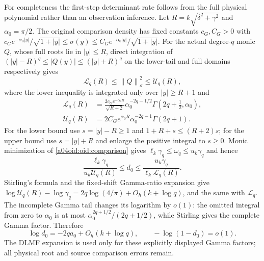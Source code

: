 \documentclass[11pt,a4paper]{article}
\providecommand{\norm}[1]{\left\lVert#1\right\rVert}
\begin{document}
For completeness the first-step determinant rate follows from the
full physical polynomial rather than an observation inference.
Let $R=k\sqrt{\delta^2+\gamma^2}$ and $\alpha_0=\pi/2$.
The original comparison density has fixed constants $c_G,C_G>0$
with
$c_Ge^{-\alpha_0|y|}/\sqrt{1+|y|}\le\sigma(y)
\le C_Ge^{-\alpha_0|y|}/\sqrt{1+|y|}$.
For the actual degree-$q$ monic $Q$, whose full roots lie in
$|y|\le R$, direct integration of
$(|y|-R)^q\le |Q(y)|\le(|y|+R)^q$ on the lower-tail and full
domains respectively gives
\[
 \mathscr L_q(R)\le\norm Q_\sigma^2\le\mathscr U_q(R),
\]
where the lower inequality is integrated only over $|y|\ge R+1$ and
\begin{align*}
 \mathscr L_q(R)&=\frac{2c_Ge^{-\alpha_0R}}{\sqrt{R+2}}
 \alpha_0^{-2q-1/2}\Gamma(2q+\tfrac12,\alpha_0),\\
 \mathscr U_q(R)&=2C_Ge^{\alpha_0R}
 \alpha_0^{-2q-1}\Gamma(2q+1).
\end{align*}
For the lower bound use $s=|y|-R\ge1$ and
$1+R+s\le(R+2)s$; for the upper bound use $s=|y|+R$ and
enlarge the positive integral to $s\ge0$. Monic minimization of
\eqref{a04oid:oid:comparison} gives
$\ell_k\gamma_q\le\omega_q\le u_k\gamma_q$ and hence
\begin{equation}\label{a04oid:oid:finited0}
 \frac{\ell_k\gamma_q}{u_k\mathscr U_q(R)}
 \le d_0\le
 \frac{u_k\gamma_q}{\ell_k\mathscr L_q(R)}.
\end{equation}
Stirling's formula and the fixed-shift Gamma-ratio expansion
\cite[\S5.11(i), (iii)]{a04oid:DLMF5} give
$\log\mathscr U_q(R)-\log\gamma_q
=2q\log(4/\pi)+O_h(k+\log q)$, and the same with
$\mathscr L_q$. The incomplete Gamma tail changes its logarithm
by $o(1)$: the omitted integral from zero to $\alpha_0$ is at most
$\alpha_0^{2q+1/2}/(2q+1/2)$, while Stirling gives the complete
Gamma factor. Therefore
\begin{equation}\label{a04oid:oid:d0rate}
 \log d_0=-2qa_0+O_h(k+\log q),\qquad
 -\log(1-d_0)=o(1).
\end{equation}
The DLMF expansion is used only for these explicitly displayed
Gamma factors; all physical root and source comparison errors remain.
\end{document}
